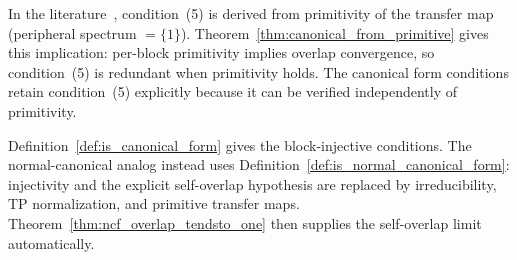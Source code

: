 \begin{remark}\label{rem:overlap_hypothesis}
    In the literature~\cite{Cirac2021Matrix},
    condition~(5) is derived from primitivity of the
    transfer map (peripheral spectrum $= \{1\}$).
    Theorem~\ref{thm:canonical_from_primitive} gives this implication:
    per-block primitivity implies overlap convergence,
    so condition~(5) is redundant when primitivity holds.
    The canonical form conditions retain condition~(5)
    explicitly because it can be verified independently of primitivity.
\end{remark}

\begin{remark}\label{rem:normal_cf_companion}
    Definition~\ref{def:is_canonical_form} gives the block-injective conditions.
    The normal-canonical analog instead uses
    Definition~\ref{def:is_normal_canonical_form}: injectivity and the explicit
    self-overlap hypothesis are replaced by irreducibility, TP normalization,
    and primitive transfer maps. Theorem~\ref{thm:ncf_overlap_tendsto_one}
    then supplies the self-overlap limit automatically.
\end{remark}
